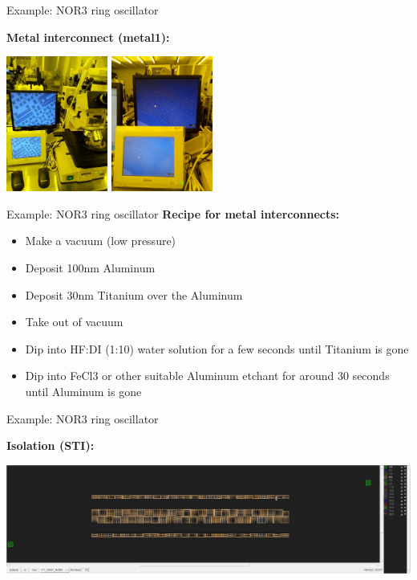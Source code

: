\documentclass[aspectratio=169]{beamer}
\begin{document}
\begin{frame}{Example: NOR3 ring oscillator}
\begin{center}
	\textbf{Metal interconnect (metal1):}

	\includegraphics[width=0.25\textwidth]{images/20181218_115931.jpg}
	\includegraphics[width=0.25\textwidth]{images/20181218_161016.jpg}
\end{center}
\end{frame}

\begin{frame}{Example: NOR3 ring oscillator}
	\textbf{Recipe for metal interconnects:}

	\begin{itemize}
		\item Make a vacuum (low pressure)
		\item Deposit 100nm Aluminum
		\item Deposit 30nm Titanium over the Aluminum
		\item Take out of vacuum
		\item Dip into HF:DI (1:10) water solution for a few seconds until Titanium is gone
		\item Dip into FeCl3 or other suitable Aluminum etchant for around 30 seconds until Aluminum is gone
	\end{itemize}
	
\end{frame}


\begin{frame}{Example: NOR3 ring oscillator}
\begin{center}
	\textbf{Isolation (STI):}

	\includegraphics[width=\textwidth]{images/Screenshot_20181220_164222.png}
\end{center}
\end{frame}
\end{document}
